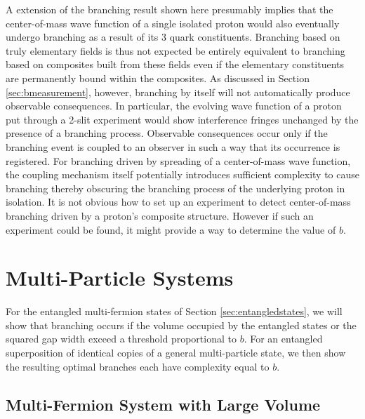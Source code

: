 \documentclass[twocolumn,amsmath,amssymb]{revtex4-1}
\begin{document}
A extension of the branching result shown here
presumably implies
that the center-of-mass wave function
of a single isolated proton
would also eventually undergo branching
as a result of its 3 quark constituents.
Branching based on truly elementary fields
is thus not expected be entirely equivalent to branching
based on composites built from these fields
even if the elementary constituents are permanently bound
within the composites.
As discussed in Section \ref{sec:bmeasurement},
however, branching by itself will not
automatically produce observable consequences.
In particular, the evolving wave function of
a proton put through a 2-slit
experiment would show interference fringes
unchanged by the presence
of a branching process.
Observable consequences occur only if
the branching event is coupled to an observer
in such a way that its occurrence is registered.
For branching driven by spreading of
a center-of-mass wave function,
the coupling mechanism itself potentially
introduces sufficient complexity to cause branching
thereby obscuring the branching process
of the underlying proton in isolation.
It is not obvious how to set up
an experiment to detect center-of-mass
branching driven by a proton's
composite structure.
However if such an experiment could be
found, it might provide a way
to determine the value of $b$.




\section{\label{sec:nparticles} Multi-Particle Systems}

For the entangled multi-fermion states of Section \ref{sec:entangledstates}, we
will show that branching occurs if the volume occupied by the entangled
states or the squared gap width exceed a threshold proportional to $b$. For an entangled
superposition of identical copies of a general multi-particle
state, we then show the resulting optimal branches each have complexity
equal to $b$. 

\subsection{\label{subsec:nfermionsv} Multi-Fermion System with Large Volume}
\end{document}
